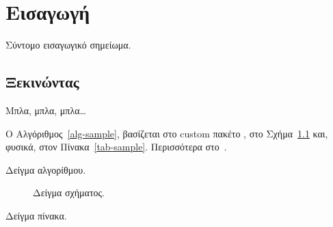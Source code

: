 \graphicspath{{./figs/intro/}}
\chapter{Εισαγωγή}
\label{chap-intro}

Σύντομο εισαγωγικό σημείωμα.

\section{Ξεκινώντας}
Μπλα, μπλα, μπλα\dots

Ο Αλγόριθμος~\ref{alg-sample}, βασίζεται στο custom πακέτο
, στο 
Σχήμα~\ref{fig-sample} και, φυσικά, στον Πίνακα~\ref{tab-sample}. Περισσότερα
στο~\cite{karakasis12cslab}.

\begin{algorithm}
  \algtoprule
  \begin{algorithmic}[1]
            \label{al-row-start}
            \EndFor\label{al-row-end}
        \EndFor
    \EndProcedure
  \end{algorithmic}
  \algbottomrule
  \caption{Δείγμα αλγορίθμου.}
  \label{alg-sample}
\end{algorithm}

\begin{figure}
  \centering
  \caption{Δείγμα σχήματος.}
  \label{fig-sample}
\end{figure}

\begin{table}
  \centering
  \caption{Δείγμα πίνακα.}
  \label{tab-sample}
\end{table}
